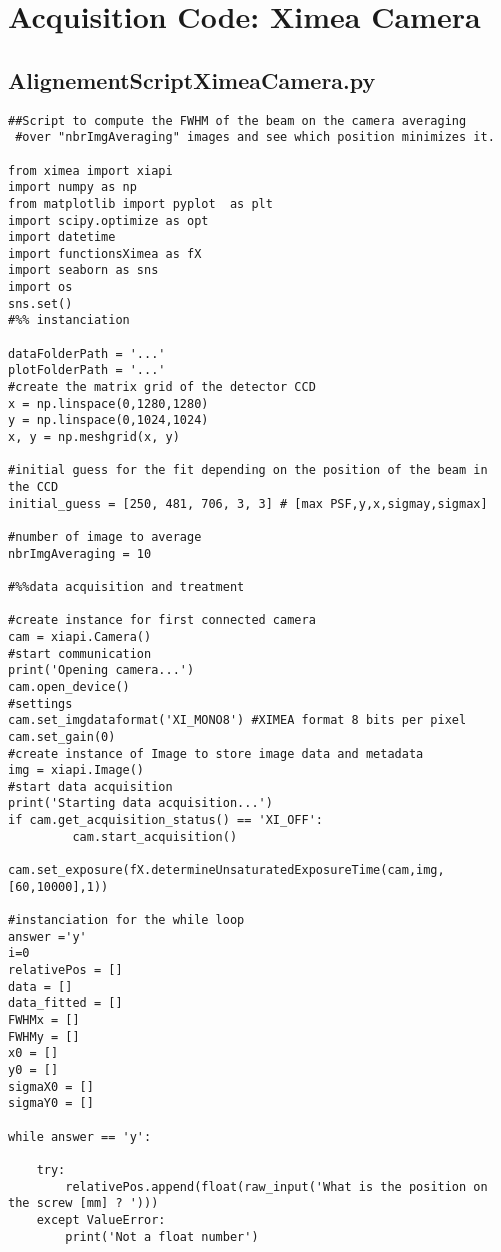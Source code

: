 \section{Acquisition Code: Ximea Camera}
\label{app:AcquisitionCodeXimea}

\subsection{AlignementScriptXimeaCamera.py}
\label{subapp:AlignementScriptXimeaCamera}

\begin{lstlisting}
##Script to compute the FWHM of the beam on the camera averaging
 #over "nbrImgAveraging" images and see which position minimizes it.

from ximea import xiapi
import numpy as np
from matplotlib import pyplot  as plt
import scipy.optimize as opt
import datetime
import functionsXimea as fX
import seaborn as sns
import os
sns.set()
#%% instanciation

dataFolderPath = '...'
plotFolderPath = '...'
#create the matrix grid of the detector CCD
x = np.linspace(0,1280,1280)
y = np.linspace(0,1024,1024)
x, y = np.meshgrid(x, y)
 
#initial guess for the fit depending on the position of the beam in the CCD
initial_guess = [250, 481, 706, 3, 3] # [max PSF,y,x,sigmay,sigmax]

#number of image to average
nbrImgAveraging = 10

#%%data acquisition and treatment

#create instance for first connected camera
cam = xiapi.Camera()
#start communication
print('Opening camera...')
cam.open_device()
#settings
cam.set_imgdataformat('XI_MONO8') #XIMEA format 8 bits per pixel
cam.set_gain(0)
#create instance of Image to store image data and metadata
img = xiapi.Image()
#start data acquisition
print('Starting data acquisition...')
if cam.get_acquisition_status() == 'XI_OFF':
         cam.start_acquisition()

cam.set_exposure(fX.determineUnsaturatedExposureTime(cam,img,[60,10000],1))

#instanciation for the while loop
answer ='y'
i=0
relativePos = []
data = []
data_fitted = []
FWHMx = []
FWHMy = []
x0 = []
y0 = []
sigmaX0 = []
sigmaY0 = []

while answer == 'y':

    try:
        relativePos.append(float(raw_input('What is the position on the screw [mm] ? ')))
    except ValueError:
        print('Not a float number')
        

\end{lstlisting}
